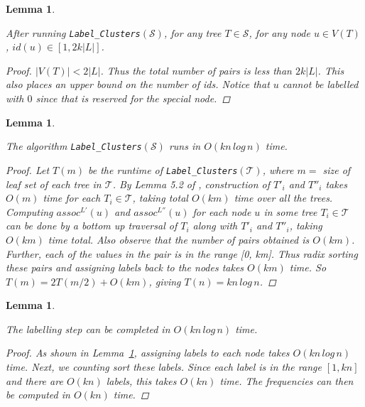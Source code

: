 \documentclass{article}
\newtheorem{labelclustersidbounds}[incompatibility]{Lemma}
\newtheorem{labelclustersruntime}[incompatibility]{Lemma}
\newtheorem{labellingruntime}[incompatibility]{Lemma}
\begin{document}
    \medskip
    \begin{labelclustersidbounds}
        \label{lem:labelclustersidbounds}

        After running \texttt{Label\_Clusters}$(\mathcal{S})$, for any tree $T \in \mathcal{S}$, for any node $u \in V(T)$, $id(u) \in [1, 2k |L|]$.

        \begin{proof}
            $|V(T)| < 2|L|$. Thus the total number of pairs is less than $2k|L|$. This also places an upper bound on the number of ids. Notice that $u$ cannot be labelled with $0$ since that is reserved for the special node.
        \end{proof}
    \end{labelclustersidbounds}

    \medskip
    \begin{labelclustersruntime}
        \label{lem:labelclustersruntime}

        The algorithm \texttt{Label\_Clusters}$(\mathcal{S})$ runs in $O(kn\,log\,n)$ time.

        \begin{proof}
            Let $T(m)$ be the runtime of \texttt{Label\_Clusters}$(\mathcal{T})$, where $m =$ size of leaf set of each tree in $\mathcal{T}$. By Lemma 5.2 of \cite{farach1995fast}, construction of $T'_i$ and $T''_i$ takes $O(m)$ time for each $T_i \in \mathcal{T}$, taking total $O(km)$ time over all the trees. Computing $assoc^{L'}(u)$ and $assoc^{L''}(u)$ for each node $u$ in some tree $T_i \in \mathcal{T}$ can be done by a bottom up traversal of $T_i$ along with $T'_i$ and $T''_i$, taking $O(km)$ time total. Also observe that the number of pairs obtained is $O(km)$. Further, each of the values in the pair is in the range [0, km]. Thus radix sorting these pairs and assigning labels back to the nodes takes $O(km)$ time. So $T(m) = 2T(m/2) + O(km)$, giving $T(n) = kn\,log\,n$.
        \end{proof}
    \end{labelclustersruntime}

    \medskip
    \begin{labellingruntime}
        \label{lem:labellingruntime}

        The labelling step can be completed in $O(kn\,log\,n)$ time.

        \begin{proof}
            As shown in Lemma~\ref{lem:labelclustersruntime}, assigning labels to each node takes $O(kn\,log\,n)$ time. Next, we counting sort these labels. Since each label is in the range $[1, kn]$ and there are $O(kn)$ labels, this takes $O(kn)$ time. The frequencies can then be computed in $O(kn)$ time.
        \end{proof}
    \end{labellingruntime}
\end{document}
